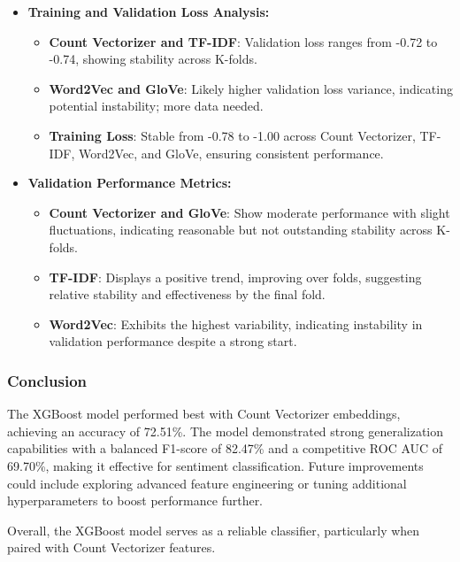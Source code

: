 \begin{itemize}
    \item \textbf{Training and Validation Loss Analysis:}
    \begin{itemize}
        \item \textbf{Count Vectorizer and TF-IDF}: Validation loss ranges from -0.72 to -0.74, showing stability across K-folds.
        \item \textbf{Word2Vec and GloVe}: Likely higher validation loss variance, indicating potential instability; more data needed.
        \item \textbf{Training Loss}: Stable from -0.78 to -1.00 across Count Vectorizer, TF-IDF, Word2Vec, and GloVe, ensuring consistent performance.
    \end{itemize}
    
    \item \textbf{Validation Performance Metrics:}
    \begin{itemize}
        \item \textbf{Count Vectorizer and GloVe}: Show moderate performance with slight fluctuations, indicating reasonable but not outstanding stability across K-folds.
        \item \textbf{TF-IDF}: Displays a positive trend, improving over folds, suggesting relative stability and effectiveness by the final fold.
        \item \textbf{Word2Vec}: Exhibits the highest variability, indicating instability in validation performance despite a strong start.
    \end{itemize}
\end{itemize}

\subsubsection{Conclusion}

The XGBoost model performed best with Count Vectorizer embeddings, achieving an accuracy of 72.51\%. The model demonstrated strong generalization capabilities with a balanced F1-score of 82.47\% and a competitive ROC AUC of 69.70\%, making it effective for sentiment classification. Future improvements could include exploring advanced feature engineering or tuning additional hyperparameters to boost performance further.

Overall, the XGBoost model serves as a reliable classifier, particularly when paired with Count Vectorizer features.

